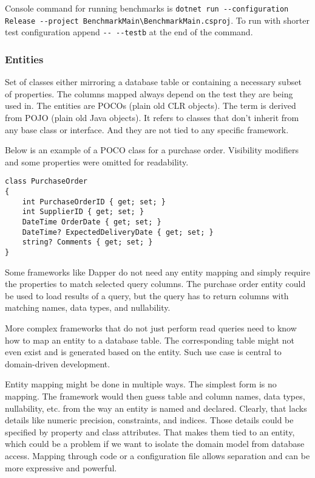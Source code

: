 Console command for running benchmarks is \lstinline{dotnet run --configuration Release --project BenchmarkMain\BenchmarkMain.csproj}. To run with shorter test configuration append \lstinline{-- --testb} at the end of the command.


\subsubsection{Entities}
Set of classes either mirroring a database table or containing a necessary subset of properties. The columns mapped always depend on the test they are being used in. The entities are POCOs (plain old CLR objects). The term is derived from POJO (plain old Java objects). \cite{Fowler2003POJO} It refers to classes that don't inherit from any base class or interface. And they are not tied to any specific framework.

Below is an example of a POCO class for a purchase order. Visibility modifiers and some properties were omitted for readability. 


\begin{lstlisting}[language=CSharp]
class PurchaseOrder
{
    int PurchaseOrderID { get; set; }
    int SupplierID { get; set; }
    DateTime OrderDate { get; set; }
    DateTime? ExpectedDeliveryDate { get; set; }
    string? Comments { get; set; }
}
\end{lstlisting}

Some frameworks like Dapper do not need any entity mapping and simply require the properties to match selected query columns. The purchase order entity could be used to load results of a query, but the query has to return columns with matching names, data types, and nullability.

More complex frameworks that do not just perform read queries need to know how to map an entity to a database table. The corresponding table might not even exist and is generated based on the entity. Such use case is central to domain-driven development\cite{FowlerDDD}.

Entity mapping might be done in multiple ways. The simplest form is no mapping. The framework would then guess table and column names, data types, nullability, etc. from the way an entity is named and declared. Clearly, that lacks details like numeric precision, constraints, and indices.
Those details could be specified by property and class attributes. That makes them tied to an entity, which could be a problem if we want to isolate the domain model from database access. 
Mapping through code or a configuration file allows separation and can be more expressive and powerful.

